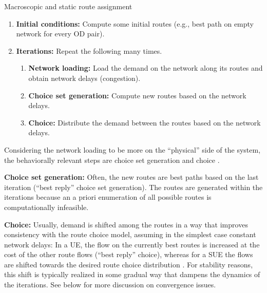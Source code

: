 \begin{algorithm}[H]
\label{static-macro-routes}

\caption{Macroscopic and static route assignment}

\begin{enumerate}

\item \textbf{Initial conditions:} Compute some initial routes
  (e.g., best path on empty network for every OD pair).

\item \textbf{Iterations:} Repeat the following many times.

\begin{enumerate}

\item \textbf{Network loading:} Load the demand on the network along
  its routes and obtain network delays (congestion).

\item \textbf{Choice set generation:} Compute new routes based on the
  network delays.

\item \textbf{Choice:} Distribute the demand between the routes based
  on the network delays.

\end{enumerate} %

\end{enumerate}

\end{algorithm}

Considering the network loading to be more on the ``physical'' side of the system, the behaviorally relevant steps are choice set generation and choice \citep{bowman-1998}.

\textbf{Choice set generation:} Often, the new routes are best paths
based on the last iteration (``best reply'' choice set generation).
The routes are generated within the iterations because an a priori
enumeration of all possible routes is computationally infeasible.

\textbf{Choice:} Usually, demand is shifted among the routes in a way
that improves consistency with the route choice model, assuming
in the simplest case
constant network delays: In a UE, the flow on the currently best routes
is increased at the cost of the other route flows (``best reply''
choice), whereas for a SUE the flows are shifted towards the desired
route choice distribution \citep[often a version of multinomial logit,
  e.g.,][]{dial-1971, cascetta-1996, ben-akiva-1999}. For
stability reasons, this shift is typically realized in some gradual
way that dampens the dynamics of the iterations. See below for more
discussion on convergence issues.


